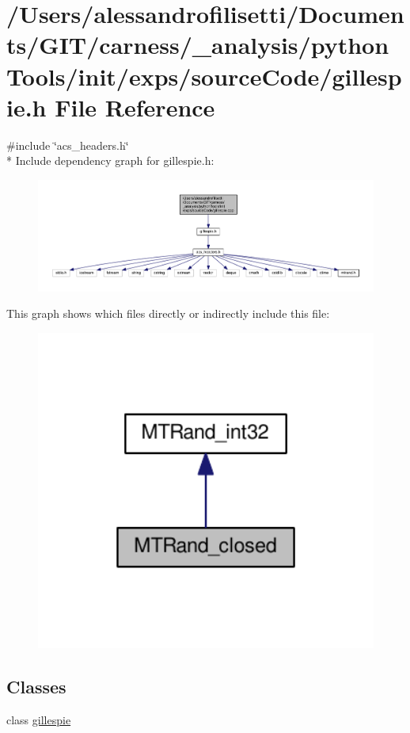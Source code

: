 \hypertarget{a00066}{\section{/\-Users/alessandrofilisetti/\-Documents/\-G\-I\-T/carness/\-\_\-analysis/python\-Tools/init/exps/source\-Code/gillespie.h File Reference}
\label{a00066}
}
{\ttfamily \#include \char`\"{}acs\-\_\-headers.\-h\char`\"{}}\\*
Include dependency graph for gillespie.\-h\-:
\nopagebreak
\begin{figure}[H]
\begin{center}
\leavevmode
\includegraphics[width=350pt]{a00184}
\end{center}
\end{figure}
This graph shows which files directly or indirectly include this file\-:
\nopagebreak
\begin{figure}[H]
\begin{center}
\leavevmode
\includegraphics[width=350pt]{a00185}
\end{center}
\end{figure}
\subsection*{Classes}
\begin{DoxyCompactItemize}
\item 
class \hyperlink{a00015}{gillespie}
\end{DoxyCompactItemize}
